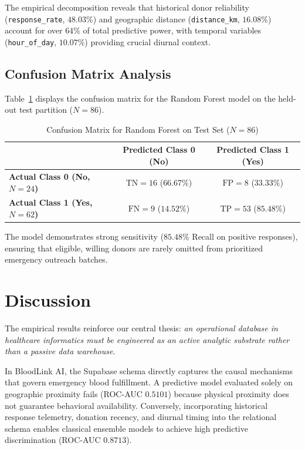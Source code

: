 \documentclass[conference]{IEEEtran}
\begin{document}
The empirical decomposition reveals that historical donor reliability (\texttt{response\_rate}, $48.03\%$) and geographic distance (\texttt{distance\_km}, $16.08\%$) account for over $64\%$ of total predictive power, with temporal variables (\texttt{hour\_of\_day}, $10.07\%$) providing crucial diurnal context.

\subsection{Confusion Matrix Analysis}
Table~\ref{tab:confusion_matrix} displays the confusion matrix for the Random Forest model on the held-out test partition ($N=86$).

\begin{table}[H]
\caption{Confusion Matrix for Random Forest on Test Set ($N=86$)}
\label{tab:confusion_matrix}
\centering
\begin{tabular}{lcc}
\toprule
& \textbf{Predicted Class 0 (No)} & \textbf{Predicted Class 1 (Yes)} \\
\midrule
\textbf{Actual Class 0 (No, $N=24$)} & $\text{TN} = 16$ ($66.67\%$) & $\text{FP} = 8$ ($33.33\%$) \\
\textbf{Actual Class 1 (Yes, $N=62$)} & $\text{FN} = 9$ ($14.52\%$) & $\text{TP} = 53$ ($85.48\%$) \\
\bottomrule
\end{tabular}
\end{table}

The model demonstrates strong sensitivity ($85.48\%$ Recall on positive responses), ensuring that eligible, willing donors are rarely omitted from prioritized emergency outreach batches.

\section{Discussion}
The empirical results reinforce our central thesis: \textit{an operational database in healthcare informatics must be engineered as an active analytic substrate rather than a passive data warehouse}. 

In BloodLink AI, the Supabase schema directly captures the causal mechanisms that govern emergency blood fulfillment. A predictive model evaluated solely on geographic proximity fails (ROC-AUC $0.5101$) because physical proximity does not guarantee behavioral availability. Conversely, incorporating historical response telemetry, donation recency, and diurnal timing into the relational schema enables classical ensemble models to achieve high predictive discrimination (ROC-AUC $0.8713$).
\end{document}
